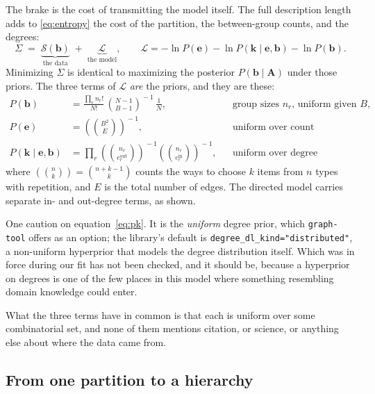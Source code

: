 \documentclass[11pt]{article}
\newcommand{\code}[1]{\texttt{\small #1}}
\begin{document}
The brake is the cost of transmitting the model itself. The full description
length adds to \eqref{eq:entropy} the cost of the partition, the between-group
counts, and the degrees:
\begin{equation}
\Sigma \;=\; \underbrace{\mathcal{S}(\bm{b})}_{\text{the data}}
  \;+\; \underbrace{\mathcal{L}}_{\text{the model}},
\qquad
\mathcal{L} = -\ln P(\bm{e}) - \ln P(\bm{k} \mid \bm{e}, \bm{b})
  - \ln P(\bm{b}).
\label{eq:dl}
\end{equation}
Minimizing $\Sigma$ is identical to maximizing the posterior
$P(\bm{b} \mid \bm{A})$ under those priors. The three terms of $\mathcal{L}$
\emph{are} the priors, and they are these:
\begin{align}
P(\bm{b}) &= \frac{\prod_r n_r!}{N!}
  \,\binom{N-1}{B-1}^{\!-1}\,\frac{1}{N},
  &&\text{group sizes $n_r$, uniform given $B$,}\label{eq:pb}\\[2pt]
P(\bm{e}) &= \left(\!\!\binom{B^2}{E}\!\!\right)^{\!-1},
  &&\text{uniform over count matrices,}\label{eq:pe}\\[2pt]
P(\bm{k} \mid \bm{e}, \bm{b}) &= \prod_r
  \left(\!\!\binom{n_r}{e^{\text{out}}_{r}}\!\!\right)^{\!-1}
  \left(\!\!\binom{n_r}{e^{\text{in}}_{r}}\!\!\right)^{\!-1},
  &&\text{uniform over degree sequences,}\label{eq:pk}
\end{align}
where $\left(\!\binom{n}{k}\!\right) = \binom{n+k-1}{k}$ counts the ways to
choose $k$ items from $n$ types with repetition, and $E$ is the total number of
edges. The directed model carries separate in- and out-degree terms, as shown.

One caution on equation~\eqref{eq:pk}. It is the \emph{uniform} degree prior, which
\code{graph-tool} offers as an option; the library's default is
\code{degree_dl_kind="distributed"}, a non-uniform hyperprior that models the
degree distribution itself. Which was in force during our fit has not been
checked, and it should be, because a hyperprior on degrees is one of the few
places in this model where something resembling domain knowledge could enter.

What the three terms have in common is that each is uniform over some
combinatorial set, and none of them mentions citation, or science, or anything
else about where the data came from.

\subsection{From one partition to a hierarchy}
\end{document}
